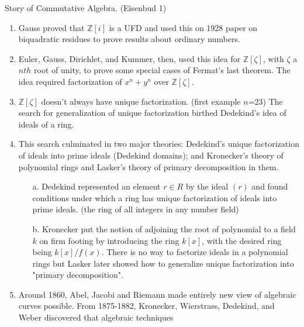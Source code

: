 \begin{notes}
      Story of Commutative Algebra. (Eisenbud 1)
\end{notes}

\begin{enumerate}
      \item
            Gauss proved that $\mathbb{Z}[i]$ is a UFD and used this
            on 1928 paper on biquadratic residues to prove results about
            ordinary numbers.
      \item
            Euler, Gauss, Dirichlet, and Kummer, then, used this idea for $\mathbb{Z}
                  [\zeta]$, with $\zeta$ a $nth$ root of unity,
            to prove some special cases of Fermat's last theorem. The idea required factorization
            of $x^n+y^n$ over $\mathbb{Z}[\zeta]$.
      \item
            $\mathbb{Z}[\zeta]$ doesn't always have unique factorization. (first example
            $n$=23) The search for generalization of unique factorization birthed Dedekind's
            idea of ideals of a ring.
      \item
            This search culminated in two major theories:
            Dedekind's unique factorization of ideals into prime ideals (Dedekind
            domains); and Kronecker's theory of polynomial rings and Lasker's theory
            of primary decomposition in them.
            \begin{enumerate}
                  \item[a.]
                        Dedekind represented an element $r\in R$ by the ideal $(r)$ and found conditions
                        under which a ring has unique factorization of ideals into prime ideals. (the ring
                        of all integers in any number field)
                  \item[b.]
                        Kronecker put the notion of adjoining the root of polynomial to a field $k$ on firm footing
                        by introducing the ring $k[x]$, with the desired ring being $k[x]/f(x)$. There is no way to
                        factorize ideals in a polynomial rings but Lasker later showed how to generalize unique
                        factorization into "primary decomposition".
            \end{enumerate}
      \item
            Around 1860, Abel, Jacobi and Riemann made entirely new view of algebraic curves possible.
            From 1875-1882, Kronecker, Wierstrass, Dedekind, and Weber discovered that algebraic techniques

\end{enumerate}
